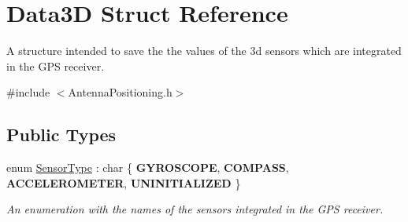 \hypertarget{structData3D}{}\section{Data3D Struct Reference}
\label{structData3D}


A structure intended to save the the values of the 3d sensors which are integrated in the G\+PS receiver.  




{\ttfamily \#include $<$Antenna\+Positioning.\+h$>$}

\subsection*{Public Types}
\begin{DoxyCompactItemize}
\item 
\mbox{\label{structData3D_a1b38ab89b23a0b2b309671ac9281a2ac}} 
enum \hyperlink{structData3D_a1b38ab89b23a0b2b309671ac9281a2ac}{Sensor\+Type} \+: char \{ {\bfseries G\+Y\+R\+O\+S\+C\+O\+PE}, 
{\bfseries C\+O\+M\+P\+A\+SS}, 
{\bfseries A\+C\+C\+E\+L\+E\+R\+O\+M\+E\+T\+ER}, 
{\bfseries U\+N\+I\+N\+I\+T\+I\+A\+L\+I\+Z\+ED}
 \}\begin{DoxyCompactList}\small\item\em An enumeration with the names of the sensors integrated in the G\+PS receiver. \end{DoxyCompactList}
\end{DoxyCompactItemize}
